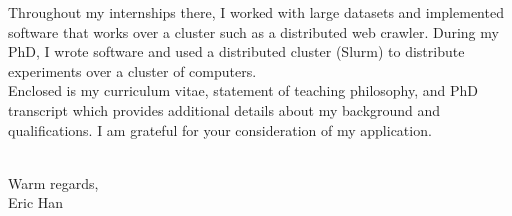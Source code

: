 \documentclass[11pt, a4paper]{article}
\begin{document}
\begin{minipage}[t]{0.95\textwidth}
{  Throughout my internships there, I worked with large datasets and implemented software that works over a cluster such as a distributed web crawler.
  During my PhD, I wrote software and used a distributed cluster (Slurm) to distribute experiments over a cluster of computers.
  \\[.5em]
  Enclosed is my curriculum vitae, statement of teaching philosophy, and PhD transcript which provides additional details about my background and qualifications.
  I am grateful for your consideration of my application.
}\end{minipage}\\[1em]

Warm regards,\\
Eric Han\\
\end{document}
